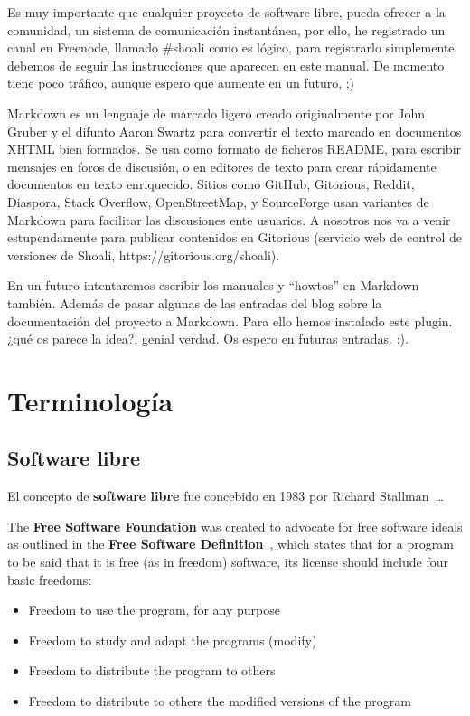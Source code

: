 \documentclass[a4paper, 12pt]{book}
\begin{document}
Es muy importante que cualquier proyecto de software libre, pueda ofrecer a la comunidad, un sistema de comunicación instantánea, por ello,  he registrado un canal en Freenode, llamado #shoali como es lógico, para registrarlo simplemente debemos de seguir las instrucciones que aparecen en este manual. De momento tiene poco tráfico, aunque espero que aumente en un futuro, ;)

Markdown es un lenguaje de marcado ligero creado originalmente por John Gruber y el difunto Aaron Swartz para convertir el texto marcado en documentos XHTML bien formados. Se usa como formato de ficheros README, para escribir mensajes en foros de discusión, o en editores de texto para crear rápidamente documentos en texto enriquecido. Sitios como GitHub, Gitorious, Reddit, Diaspora, Stack Overflow, OpenStreetMap, y SourceForge usan variantes de Markdown para facilitar las discusiones ente usuarios. A nosotros nos va a venir estupendamente para publicar contenidos en Gitorious (servicio web de control de versiones de Shoali, https://gitorious.org/shoali).

En un futuro intentaremos escribir los manuales y “howtos” en Markdown también. Además de pasar algunas de las entradas del blog sobre la documentación del proyecto a Markdown. Para ello hemos instalado este plugin. ¿qué os parece la idea?, genial verdad.  Os espero en futuras entradas. :).



\section{Terminología}
\label{sec:terminology}

\subsection{Software libre}
\label{subsec:freesoftware}
El concepto de \textbf{software libre} fue concebido en 1983 por Richard
Stallman~\cite{GNUproject}\dots

The \textbf{Free Software Foundation} was created to advocate for free software
ideals as outlined in the \textbf{Free Software
Definition}~\cite{FreeSoftwareDef}, which states that for a program to be said
that it is free (as in freedom) software, its license should include four basic
freedoms:
\begin{itemize}
 \item Freedom to use the program, for any purpose
 \item Freedom to study and adapt the programs (modify)
 \item Freedom to distribute the program to others
 \item Freedom to distribute to others the modified versions of the program
\end{itemize}
\end{document}
